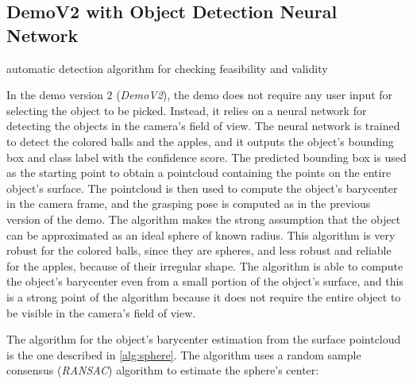 \subsection{DemoV2 with Object Detection Neural Network}

automatic detection
algorithm for checking feasibility and validity

In the demo version 2 (\textit{DemoV2}), the demo does not require any user input for selecting the object to be picked.
Instead, it relies on a neural network for detecting the objects in the camera's field of view. The neural network
is trained to detect the colored balls and the apples, and it outputs the object's bounding box and class label
with the confidence score. The predicted bounding box is used as the starting point to obtain a pointcloud
containing the points on the entire object's surface. The pointcloud is then used to compute the object's barycenter
in the camera frame, and the grasping pose is computed as in the previous version of the demo.
The algorithm makes the strong assumption that the object can be approximated as an ideal sphere of known radius.
This algorithm is very robust for the colored balls, since they are spheres, and less robust and reliable
for the apples, because of their irregular shape. The algorithm is able to compute the object's barycenter
even from a small portion of the object's surface, and this is a strong point of the algorithm because
it does not require the entire object to be visible in the camera's field of view.

The algorithm for the object's barycenter estimation from the surface pointcloud is the one described
in \ref{alg:sphere}. The algorithm uses a random sample consensus (\textit{RANSAC}) algorithm to estimate the sphere's center:

